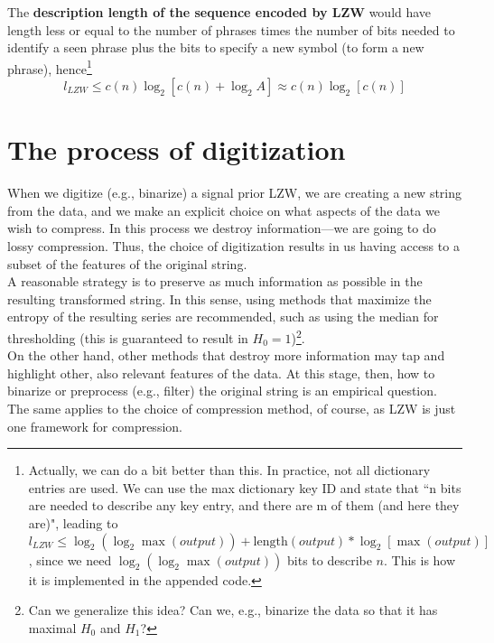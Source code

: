 \documentclass[11pt]{amsart}
\begin{document}
 The {\bf description length of the sequence encoded by LZW}  would have length less or equal to the number of phrases times the number of bits needed to identify a seen phrase plus the bits to specify a new symbol (to form a new phrase), hence\footnote{
 Actually, we can do a bit better than this. In practice, not all dictionary entries are used. We can use the max dictionary key ID and state that ``n bits are needed to describe any key entry, and there are m of them (and here they are)", leading to 
$
l_{LZW} \le \log_{2}(\log_{2}  \max(output))+ \mbox{length}(output) *  \log_{2} \left[  \max(output) \right]
$, 
since we need $ \log_{2}(\log_{2}  \max(output))$  bits to describe $n$. This is how it is implemented in the appended code.
}
\begin{equation}
l_{LZW} \le c(n) \log_{2} \left[ c(n)+ \log_{2} A \right] \approx c(n) \log_{2} \left[ c(n)\right]
\end{equation}




\section{The process of digitization}
When we digitize (e.g., binarize) a signal prior LZW, we are creating a new string from the data, and we make an explicit choice on what aspects of the data we wish to compress.   In this process we destroy information---we are going to do lossy compression. Thus, the choice of digitization results in us having access to a subset of the features of the original string. \\

A reasonable strategy is to preserve as much information as possible in the resulting transformed string. In this sense, using methods that maximize the entropy of the resulting series are recommended, such as using the median for thresholding (this is guaranteed to result  in $H_{0}=1$)\footnote{Can we generalize this idea? Can we, e.g., binarize the data so that it has maximal $H_{0}$ and $H_{1}$?}.  
\\


On the other hand, other methods that destroy more information may tap  and highlight  other, also relevant features of the data.  At this stage, then, how to binarize or preprocess (e.g., filter) the original string  is an empirical question. The same applies to the choice of compression method, of course, as LZW is just one framework for compression.
\end{document}
